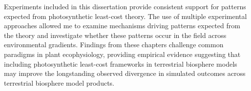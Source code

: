 \documentclass{ttuthes2007}
\begin{document}
Experiments included in this dissertation provide consistent support for patterns expected from photosynthetic least-cost theory. The use of multiple experimental approaches allowed me to examine mechanisms driving patterns expected from the theory and investigate whether these patterns occur in the field across environmental gradients. Findings from these chapters challenge common paradigms in plant ecophysiology, providing empirical evidence suggesting that including photosynthetic least-cost frameworks in terrestrial biosphere models may improve the longstanding observed divergence in simulated outcomes across terrestrial biosphere model products.

\listoftables
\listoffigures

\mainmatter


\linenumbers
\renewcommand{\linenumberfont}{\normalfont\bfseries\large\color{black}}





\end{document}
